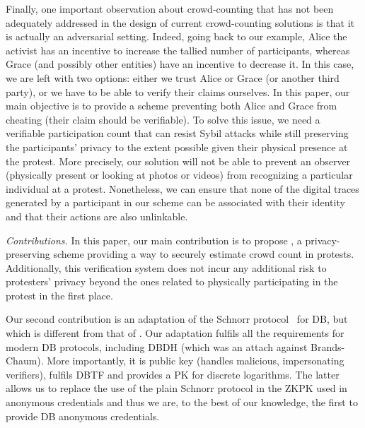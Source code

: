 Finally, one important observation about crowd-counting that has not been adequately addressed in the design of current crowd-counting solutions is that it is actually an adversarial setting. 
Indeed, going back to our example, Alice the activist has an incentive to increase the tallied number of participants, whereas Grace (and possibly other entities) have an incentive to decrease it.
In this case, we are left with two options: either we trust Alice or Grace (or 
another third party), or we have to be able to verify their claims ourselves.
In this paper, our main objective is to provide a scheme preventing both Alice and Grace from cheating (\ie their claim should be verifiable).
To solve this issue, we need a verifiable participation count that can resist Sybil attacks while still preserving the participants'
privacy to the extent possible given their physical presence at the protest. 
More precisely, our solution will not be able to prevent an observer (physically present or looking at photos or videos) from recognizing a particular individual at a protest. 
Nonetheless, we can ensure that none of the digital traces generated by a participant in our scheme can be associated with their identity and that their actions are also unlinkable.

\emph{Contributions.} In this paper, our main contribution is to propose \PRIVO, a privacy-preserving scheme providing a way to securely estimate crowd count in protests.
Additionally, this verification system does not incur any additional risk to protesters' privacy beyond the ones related to physically participating in the protest in the first place.

Our second contribution is an adaptation of the Schnorr protocol~\cite{Schnorr} 
for \ac{DB}, but which is different from that of \textcite{DistanceBounding}.
Our adaptation fulfils all the requirements for modern \ac{DB} protocols, 
including \ac{DBDH} (which was an attach against Brands-Chaum).
More importantly, it is public key (\ie handles malicious, impersonating 
verifiers), fulfils \ac{DBTF} and provides a \ac{PK} for discrete logarithms.
The latter allows us to replace the use of the plain Schnorr protocol in the 
\ac{ZKPK} used in anonymous credentials and thus we are, to the best of our 
knowledge, the first to provide \ac{DB} anonymous credentials.

